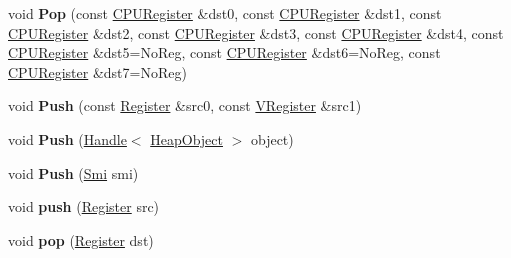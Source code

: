 \begin{DoxyCompactItemize}
\item 
\mbox{\label{classv8_1_1internal_1_1TurboAssembler_a7dfdb6c5409f576c86646ad5fe664ce1}} 
void {\bfseries Pop} (const \mbox{\hyperlink{classv8_1_1internal_1_1CPURegister}{C\+P\+U\+Register}} \&dst0, const \mbox{\hyperlink{classv8_1_1internal_1_1CPURegister}{C\+P\+U\+Register}} \&dst1, const \mbox{\hyperlink{classv8_1_1internal_1_1CPURegister}{C\+P\+U\+Register}} \&dst2, const \mbox{\hyperlink{classv8_1_1internal_1_1CPURegister}{C\+P\+U\+Register}} \&dst3, const \mbox{\hyperlink{classv8_1_1internal_1_1CPURegister}{C\+P\+U\+Register}} \&dst4, const \mbox{\hyperlink{classv8_1_1internal_1_1CPURegister}{C\+P\+U\+Register}} \&dst5=No\+Reg, const \mbox{\hyperlink{classv8_1_1internal_1_1CPURegister}{C\+P\+U\+Register}} \&dst6=No\+Reg, const \mbox{\hyperlink{classv8_1_1internal_1_1CPURegister}{C\+P\+U\+Register}} \&dst7=No\+Reg)
\item 
\mbox{\label{classv8_1_1internal_1_1TurboAssembler_af4dd1ab813e77e1e4441593db1aab04b}} 
void {\bfseries Push} (const \mbox{\hyperlink{classv8_1_1internal_1_1Register}{Register}} \&src0, const \mbox{\hyperlink{classv8_1_1internal_1_1VRegister}{V\+Register}} \&src1)
\item 
\mbox{\label{classv8_1_1internal_1_1TurboAssembler_acdcc491a63e0134aeef3a1242a11e29a}} 
void {\bfseries Push} (\mbox{\hyperlink{classv8_1_1internal_1_1Handle}{Handle}}$<$ \mbox{\hyperlink{classv8_1_1internal_1_1HeapObject}{Heap\+Object}} $>$ object)
\item 
\mbox{\label{classv8_1_1internal_1_1TurboAssembler_aefc3cd9bb0e7e5183140d11765e18493}} 
void {\bfseries Push} (\mbox{\hyperlink{classv8_1_1internal_1_1Smi}{Smi}} smi)
\item 
\mbox{\label{classv8_1_1internal_1_1TurboAssembler_ad76c4db282f973f837a7960f126cd658}} 
void {\bfseries push} (\mbox{\hyperlink{classv8_1_1internal_1_1Register}{Register}} src)
\item 
\mbox{\label{classv8_1_1internal_1_1TurboAssembler_a7bcb3f467d89d755bc990f0b2d447276}} 
void {\bfseries pop} (\mbox{\hyperlink{classv8_1_1internal_1_1Register}{Register}} dst)

\end{DoxyCompactItemize}
